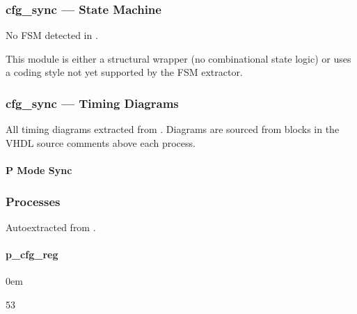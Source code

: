 \documentclass[letterpaper,10pt,english]{sphinxmanual}
\begin{document}
\sphinxstepscope


\subsubsection{cfg\_sync — State Machine}
\label{\detokenize{modules/cfg_sync/fsm:cfg-sync-state-machine}}\label{\detokenize{modules/cfg_sync/fsm::doc}}
\sphinxAtStartPar
No FSM detected in .

\sphinxAtStartPar
This module is either a structural wrapper (no combinational
state logic) or uses a coding style not yet supported by the
FSM extractor.

\sphinxstepscope


\subsubsection{cfg\_sync — Timing Diagrams}
\label{\detokenize{modules/cfg_sync/timing:cfg-sync-timing-diagrams}}\label{\detokenize{modules/cfg_sync/timing::doc}}
\sphinxAtStartPar
All timing diagrams extracted from .
Diagrams are sourced from  blocks in the VHDL
source comments above each process.


\paragraph{P Mode Sync}
\label{\detokenize{modules/cfg_sync/timing:p-mode-sync}}
\noindent{}

\sphinxstepscope


\subsubsection{Processes}
\label{\detokenize{modules/cfg_sync/processes/index:processes}}\label{\detokenize{modules/cfg_sync/processes/index::doc}}
\sphinxAtStartPar
Auto\sphinxhyphen{}extracted from .

\sphinxstepscope


\paragraph{p\_cfg\_reg}
\label{\detokenize{modules/cfg_sync/processes/p_cfg_reg:p-cfg-reg}}\label{\detokenize{modules/cfg_sync/processes/p_cfg_reg::doc}}
\begin{DUlineblock}{0em}
\item[]  
\item[]  53
\item[]  
\item[]  
\end{DUlineblock}
\end{document}

